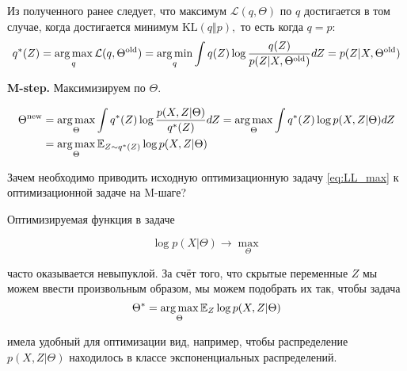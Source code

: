 \documentclass[12pt,a4paper]{article}
\begin{document}
Из полученного ранее следует, что максимум $\mathcal{L}(q, \Theta)$ по $q$ достигается в том случае, когда достигается минимум $\text{KL}(q \Vert p),$ то есть когда $q = p$:
\begin{equation*}
	q^*(Z) = \mathop{\rm arg\,max}\limits_{q} \mathcal{L}(q,\Theta^{\text{old}}) = \mathop{\rm arg\,min}\limits_{q} \int q(Z) \log \frac{q(Z)}{p(Z\vert X, \Theta^{\text{old}})} dZ = p(Z\vert X, \Theta^{\text{old}})
\end{equation*}

\textbf{M-step.} Максимизируем по $\Theta$.

\begin{align*}
	\Theta^{\text{new}} &= \mathop{\rm arg\,max}\limits_{\Theta} \int q^*(Z)\log \frac{p(X,Z\vert \Theta)}{q^*(Z)} dZ = \mathop{\rm arg\,max}\limits_{\Theta} \int q^*(Z)\log p(X,Z\vert \Theta) dZ \\ 
	&= \mathop{\rm arg\,max}\limits_{\Theta} \mathbb{E}_{Z \sim q^*(Z)} \log p(X,Z\vert \Theta)
\end{align*}

\begin{vkProblem}
	Зачем необходимо приводить исходную оптимизационную задачу \ref{eq:LL_max} к оптимизационной задаче на M-шаге?
\end{vkProblem}

\begin{esSolution}
	Оптимизируемая функция в задаче
	
	\begin{equation}
		\log p(X\vert \Theta) \rightarrow \max_{\Theta}
	\end{equation}
	
	часто оказывается невыпуклой. За счёт того, что скрытые переменные $Z$ мы можем ввести произвольным образом, мы можем подобрать их так, чтобы задача
	\begin{equation*}
		\Theta^* = \mathop{\rm arg\,max}\limits_{\Theta} \mathbb{E}_{Z} \log p(X,Z\vert \Theta)
	\end{equation*}
	
	имела удобный для оптимизации вид, например, чтобы распределение $p(X,Z\vert \Theta)$ находилось в классе экспоненциальных распределений.
\end{esSolution}
\end{document}

